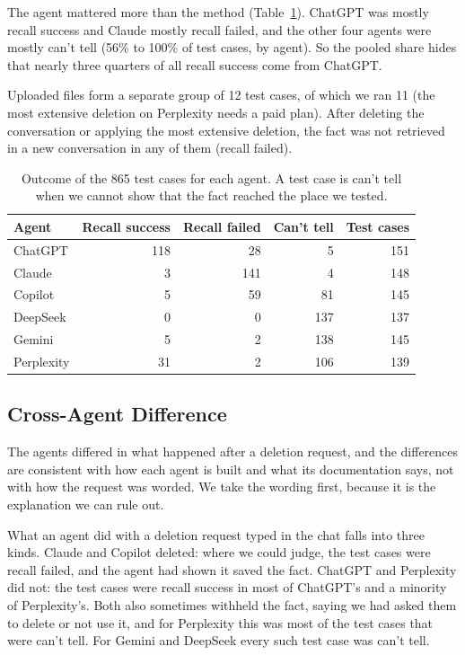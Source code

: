     The agent mattered more than the method (Table~\ref{tab:outcomes-agent}). ChatGPT was mostly recall success and Claude mostly recall failed, and the other four agents were mostly can't tell (56\% to 100\% of test cases, by agent). So the pooled share hides that nearly three quarters of all recall success come from ChatGPT.

    Uploaded files form a separate group of 12 test cases, of which we ran 11 (the most extensive deletion on Perplexity needs a paid plan). After deleting the conversation or applying the most extensive deletion, the fact was not retrieved in a new conversation in any of them (recall failed).

    \begin{table}[!t]
    \centering
    \caption{Outcome of the 865 test cases for each agent. A test case is can't tell when we cannot show that the fact reached the place we tested.}
    \label{tab:outcomes-agent}
    \footnotesize
    \begin{tabular}{@{}lrrrr@{}}
    \toprule
    Agent & Recall success & Recall failed & Can't tell & Test cases \\
    \midrule
    ChatGPT & 118 & 28 & 5 & 151 \\
    Claude & 3 & 141 & 4 & 148 \\
    Copilot & 5 & 59 & 81 & 145 \\
    DeepSeek & 0 & 0 & 137 & 137 \\
    Gemini & 5 & 2 & 138 & 145 \\
    Perplexity & 31 & 2 & 106 & 139 \\
    \bottomrule
    \end{tabular}
    \end{table}


    \subsection{Cross-Agent Difference}
    \label{sec:cross-agent}

    The agents differed in what happened after a deletion request, and the differences are consistent with how each agent is built and what its documentation says, not with how the request was worded. We take the wording first, because it is the explanation we can rule out.

    What an agent did with a deletion request typed in the chat falls into three kinds. Claude and Copilot deleted: where we could judge, the test cases were recall failed, and the agent had shown it saved the fact. ChatGPT and Perplexity did not: the test cases were recall success in most of ChatGPT's and a minority of Perplexity's. Both also sometimes withheld the fact, saying we had asked them to delete or not use it, and for Perplexity this was most of the test cases that were can't tell. For Gemini and DeepSeek every such test case was can't tell.


